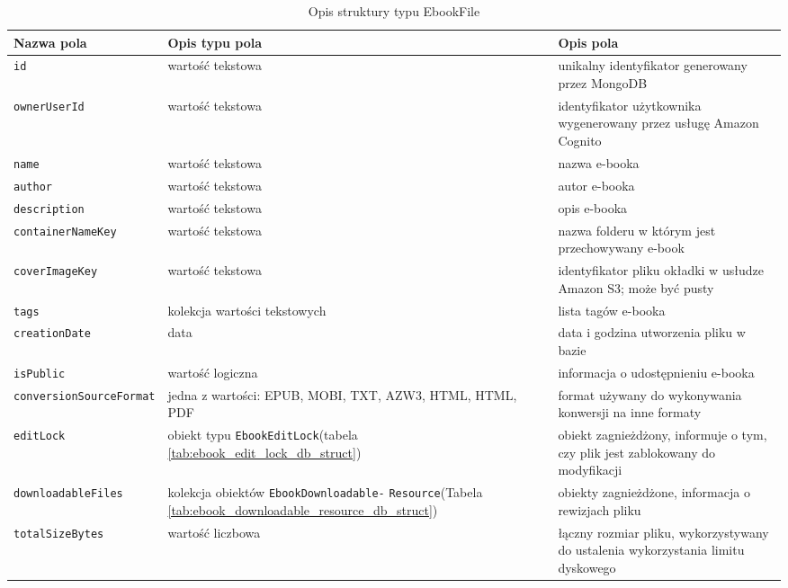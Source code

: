 \begin{table}
    \caption{Opis struktury typu EbookFile}
    \renewcommand{\arraystretch}{1.3} %
    \centering
    \begin{tabular}{|>{\centering\arraybackslash}m{4.7cm}|>{\centering\arraybackslash}m{4.7cm}|>{\centering\arraybackslash}m{4.7cm}|} \hline
        \textbf{Nazwa pola} & \textbf{Opis typu pola} & \textbf{Opis pola} \\ \hline
        \verb|id| & wartość tekstowa & unikalny identyfikator generowany przez MongoDB \\ \hline
        \verb|ownerUserId| & wartość tekstowa & identyfikator użytkownika wygenerowany przez usługę Amazon Cognito \\ \hline
        \verb|name| & wartość tekstowa & nazwa e-booka  \\ \hline
        \verb|author| & wartość tekstowa & autor e-booka \\ \hline
        \verb|description| & wartość tekstowa & opis e-booka \\ \hline
        \verb|containerNameKey| & wartość tekstowa & nazwa folderu w którym jest przechowywany e-book \\ \hline
        \verb|coverImageKey| & wartość tekstowa & identyfikator pliku okładki w usłudze Amazon S3; może być pusty \\ \hline
        \verb|tags| & kolekcja wartości tekstowych & lista tagów e-booka \\ \hline
        \verb|creationDate| & data & data i godzina utworzenia pliku w bazie \\ \hline
        \verb|isPublic| & wartość logiczna & informacja o udostępnieniu e-booka \\ \hline
        \verb|conversionSourceFormat| & jedna z wartości: EPUB, MOBI, TXT, AZW3, HTML, HTML, PDF & format używany do wykonywania konwersji na inne formaty \\ \hline
        \verb|editLock| & obiekt typu \verb|EbookEditLock|\newline(tabela \ref{tab:ebook_edit_lock_db_struct}) & obiekt zagnieżdżony, informuje o tym, czy plik jest zablokowany do modyfikacji \\ \hline
        \verb|downloadableFiles| & kolekcja obiektów \verb|EbookDownloadable-| \verb|Resource|\newline(Tabela \ref{tab:ebook_downloadable_resource_db_struct}) & obiekty zagnieżdżone, informacja o rewizjach pliku \\ \hline
        \verb|totalSizeBytes| & wartość liczbowa & łączny rozmiar pliku, wykorzystywany do ustalenia wykorzystania limitu dyskowego \\ \hline
    \end{tabular}
    \label{tab:ebook_file_db_struct}
\end{table}

